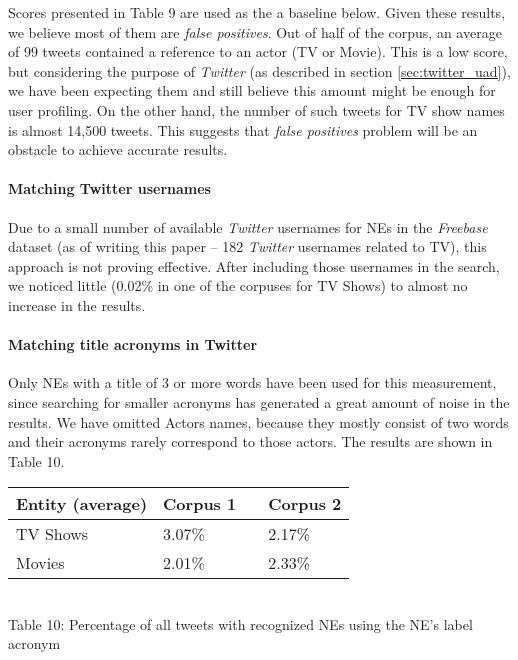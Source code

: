 Scores presented in Table 9 are used as the a baseline below. Given these results, we believe
most of them are \textit{false positives}. Out of half of the corpus, an
average of 99 tweets contained a reference to an actor (TV or Movie). This is a low score, but considering the
purpose of \textit{Twitter} (as described in section \ref{sec:twitter_uad}), we have been expecting them and still
believe this amount might be enough for user profiling. On the other hand, the number of such tweets for TV show
names is almost 14,500 tweets. This suggests that \textit{false positives} problem will be an obstacle to achieve
accurate results.

\paragraph{Matching Twitter usernames}
Due to a small number of available \textit{Twitter} usernames for NEs in the \textit{Freebase} dataset (as of writing this
paper -- 182 \textit{Twitter} usernames related to TV), this approach is not proving effective. After including those
usernames in the search, we noticed little (0.02\% in one of the corpuses for TV Shows) to almost no increase in
the results.

\paragraph{Matching title acronyms in Twitter}
Only NEs with a title of 3 or more words have been used for this measurement, since searching
for smaller acronyms has generated a great amount of noise in the results. We have omitted Actors names, because
they mostly consist of two words and their acronyms rarely correspond to those actors. The results
are shown in Table 10.

\begin{center}
  \begin{tabular}{ | p{4cm} | p{2cm} | p{1cm}| p{2cm} | } \hline
    Entity (average) & Corpus 1 & & Corpus 2 \\ \hline
    TV Shows & 3.07\% & & 2.17\% \\ \hline
    Movies & 2.01\% & & 2.33\% \\ \hline
  \end{tabular} \\
  Table 10: Percentage of all tweets with recognized NEs using the NE's label acronym \\
\end{center}

